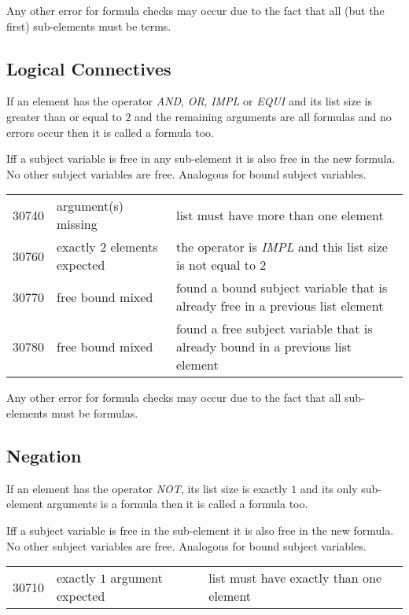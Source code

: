\documentclass[a4paper,german,10pt,twoside]{book}
\theoremstyle{definition}
\theoremstyle{remark}
\begin{document}
\par
Any other error for formula checks may occur due to the fact that all (but the first) sub-elements must be terms.


\subsection{Logical Connectives
}
If an element has the operator \emph{AND}, \emph{OR}, \emph{IMPL} or \emph{EQUI} and its list size is greater than or equal to $2$ and the remaining arguments are all formulas and no errors occur then it is called a formula too.

\par
Iff a subject variable is free in any sub-element it is also free in the new formula. No other subject variables are free. Analogous for bound subject variables. 

\begin{tabularx}{\linewidth}{llX}
  30740  & argument(s) missing      & list must have more than one element \\
  30760  & exactly $2$ elements expected & the operator is \emph{IMPL} and this list size is not equal to $2$ \\
  30770  & free bound mixed         & found a bound subject variable that is already free in a previous list element \\
  30780  & free bound mixed         & found a free subject variable that is already bound in a previous list element
\end{tabularx}

\par
Any other error for formula checks may occur due to the fact that all sub-elements must be formulas.


\subsection{Negation
}
If an element has the operator \emph{NOT}, its list size is exactly $1$ and its  only sub-element arguments is a formula then it is called a formula too.

\par
Iff a subject variable is free in the sub-element it is also free in the new formula. No other subject variables are free. Analogous for bound subject variables. 

\begin{tabularx}{\linewidth}{llX}
  30710  & exactly $1$ argument expected & list must have exactly than one element \\
\end{tabularx}
\end{document}
